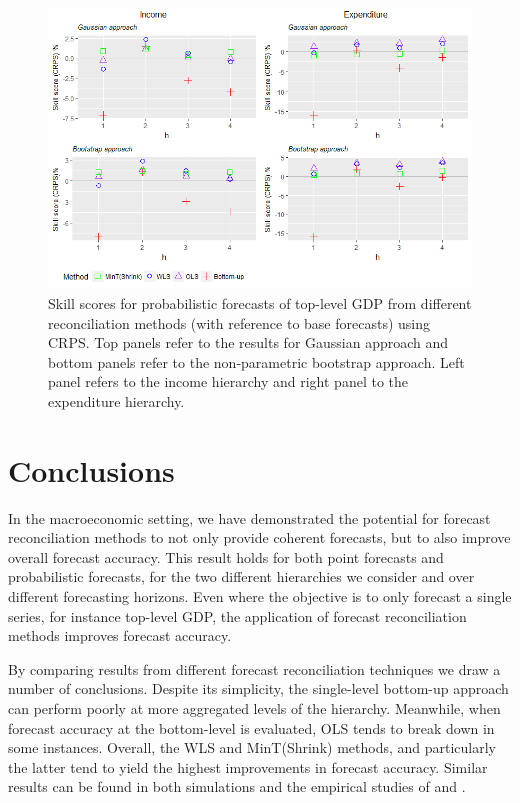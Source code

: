 \documentclass[graybox]{svmult}
\begin{document}
\begin{figure}[t]
	\centering
	\small
	\includegraphics[width=\textwidth]{Figs/Results/ProbF_UnivS.png}
	\caption{Skill scores for probabilistic forecasts of top-level GDP from different reconciliation methods (with reference to base forecasts) using CRPS. Top panels refer to the results for Gaussian approach and bottom panels refer to the non-parametric bootstrap approach. Left panel refers to the income hierarchy and right panel to the expenditure hierarchy.}
	\label{fig: Prob-forecasts-SS_CRPS}
\end{figure}


\pagebreak

\section{Conclusions}

In the macroeconomic setting, we have demonstrated the potential for forecast reconciliation methods to not only provide coherent forecasts, but to also improve overall forecast accuracy.  This result holds for both point forecasts and probabilistic forecasts, for the two different hierarchies we consider and over different forecasting horizons.  Even where the objective is to only forecast a single series, for instance top-level GDP, the application of forecast reconciliation methods improves forecast accuracy.

By comparing results from different forecast reconciliation techniques we draw a number of conclusions.  Despite its simplicity, the single-level bottom-up approach can perform poorly at more aggregated levels of the hierarchy. Meanwhile, when forecast accuracy at the bottom-level is evaluated, OLS tends to break down in some instances. Overall, the WLS and MinT(Shrink) methods, and particularly the latter tend to yield the highest improvements in forecast accuracy. Similar results can be found in both simulations and the empirical studies of \cite{AthEtAl2017} and \cite{WicEtAl2019}.
\end{document}
